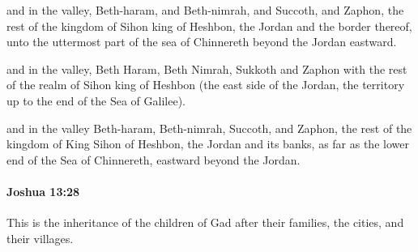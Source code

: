 			\begin{versebox}
					\item[BHS] 
					\item[ASV] and in the valley, Beth-haram, and Beth-nimrah, and Succoth, and Zaphon, the rest of the kingdom of Sihon king of Heshbon, the Jordan and the border thereof, unto the uttermost part of the sea of Chinnereth beyond the Jordan eastward.
					\item[NIV] and in the valley, Beth Haram, Beth Nimrah, Sukkoth and Zaphon with the rest of the realm of Sihon king of Heshbon (the east side of the Jordan, the territory up to the end of the Sea of Galilee).
					\item[NRSV] and in the valley Beth-haram, Beth-nimrah, Succoth, and Zaphon, the rest of the kingdom of King Sihon of Heshbon, the Jordan and its banks, as far as the lower end of the Sea of Chinnereth, eastward beyond the Jordan.
			\end{versebox}

		\paragraph{Joshua 13:28} %
			\label{JOSHUA-13-28}

			This is the inheritance of the children of Gad after their families, the cities, and their villages.

